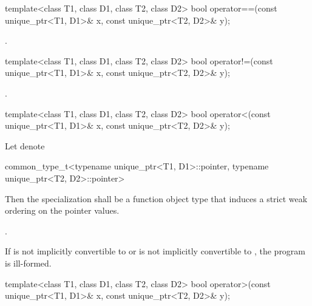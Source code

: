 %
\begin{itemdecl}
template<class T1, class D1, class T2, class D2>
  bool operator==(const unique_ptr<T1, D1>& x, const unique_ptr<T2, D2>& y);
\end{itemdecl}

\begin{itemdescr}
\pnum
\returns {}.
\end{itemdescr}

%
\begin{itemdecl}
template<class T1, class D1, class T2, class D2>
  bool operator!=(const unique_ptr<T1, D1>& x, const unique_ptr<T2, D2>& y);
\end{itemdecl}

\begin{itemdescr}
\pnum
\returns {}.
\end{itemdescr}

%
\begin{itemdecl}
template<class T1, class D1, class T2, class D2>
  bool operator<(const unique_ptr<T1, D1>& x, const unique_ptr<T2, D2>& y);
\end{itemdecl}

\begin{itemdescr}
\pnum
\requires Let  denote
\begin{codeblock}
common_type_t<typename unique_ptr<T1, D1>::pointer,
              typename unique_ptr<T2, D2>::pointer>
\end{codeblock}
Then the specialization
 shall be a function object type that
induces a strict weak ordering on the pointer values.

\pnum
\returns {}.

\pnum
\remarks If  is not implicitly convertible
to  or  is not implicitly
convertible to , the program is ill-formed.
\end{itemdescr}

%
\begin{itemdecl}
template<class T1, class D1, class T2, class D2>
  bool operator>(const unique_ptr<T1, D1>& x, const unique_ptr<T2, D2>& y);
\end{itemdecl}

